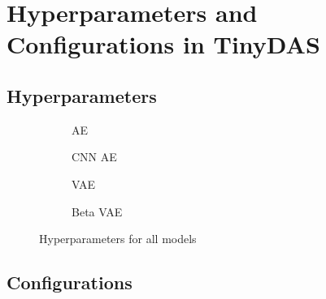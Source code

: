 \chapter{Hyperparameters and Configurations in TinyDAS}
\label{app:configs}

\section{Hyperparameters}

\begin{figure}[h]
  \begin{subfigure}[t]{.45\textwidth}
    \centering
    
    \caption{AE}
  \end{subfigure}
  \hfill
  \begin{subfigure}[t]{.45\textwidth}
    \centering
    
    \caption{CNN AE}
  \end{subfigure}

  \medskip

  \begin{subfigure}[t]{.45\textwidth}
    \centering
    
    \caption{VAE}
  \end{subfigure}
  \hfill
  \begin{subfigure}[t]{.45\textwidth}
    \centering
    
    \caption{Beta VAE}
  \end{subfigure}
    \caption{Hyperparameters for all models}
\end{figure}

\section{Configurations}

\begin{figure}[h]
    \centering
    
    \label{fig:slurmconf}
\end{figure}


